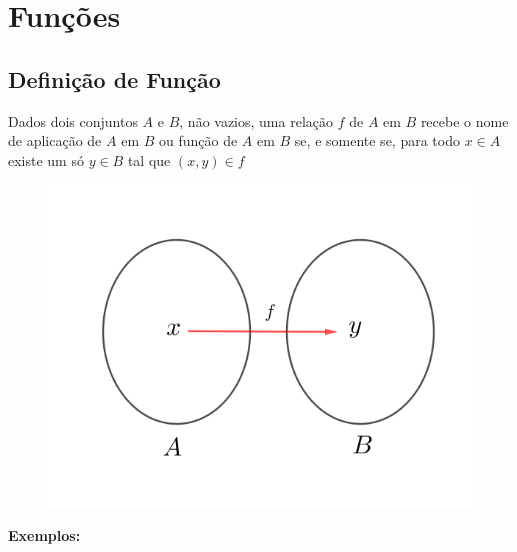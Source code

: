 \chapter{Funções}

\section{Definição de Função}

Dados dois conjuntos $A$ e $B$, não vazios, uma relação $f$ de $A$ em $B$ recebe o nome de aplicação de $A$ em $B$ ou função de $A$ em $B$ se, e somente se, para todo $x \in A$ existe um só $y \in B $ tal que $(x,y) \in f$

\begin{figure}[H]
	\centering
	
	\includegraphics[scale=3.5]{imagens/funcao.png}

\end{figure}

\textbf{Exemplos:}


